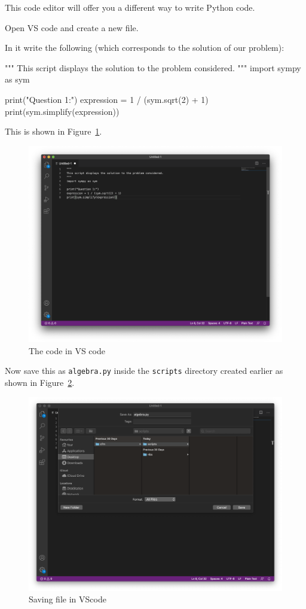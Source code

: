 This code editor will offer you a different way to write Python code.


Open VS code and create a new file.


In it write the following (which corresponds to the solution of our problem):

\begin{python}
"""
This script displays the solution to the problem considered.
"""
import sympy as sym

print("Question 1:")
expression = 1 / (sym.sqrt(2) + 1)
print(sym.simplify(expression))
\end{python}


This is shown in Figure~\ref{fig:code_in_vscode}.

\begin{figure}[!htbp]
\centering
\noindent\includegraphics[width=0.750\linewidth]{./assets/code_in_vscode/main.png}
\caption{The code in VS code}
\label{fig:code_in_vscode}
\end{figure}


Now save this as \texttt{algebra.py} inside the \texttt{scripts} directory created
earlier as shown in Figure~\ref{fig:saving_file_in_vscode}.

\begin{figure}[!htbp]
\centering
\noindent\includegraphics[width=0.750\linewidth]{./assets/saving_file_in_vscode/main.png}
\caption{Saving file in VScode}
\label{fig:saving_file_in_vscode}
\end{figure}


